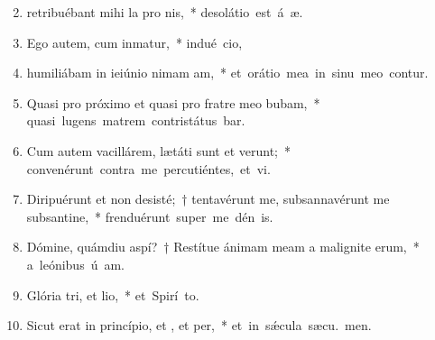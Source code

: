 \begin{flushleft}
\begin{enumerate}[leftmargin=*]
\setcounter{enumi}{1}

\item retribuébant mihi la pro nis,~* \mbox{desolátio est á æ.}

\item Ego autem, cum inmatur,~* \mbox{indué cio,}

\item humiliábam in ieiúnio nimam am,~* \mbox{et orátio mea in sinu meo contur.}

\item Quasi pro próximo et quasi pro fratre meo bubam,~* \mbox{quasi lugens matrem contristátus bar.}

\item Cum autem vacillárem, lætáti sunt et verunt;~* \mbox{convenérunt contra me percutiéntes, et vi.}

\item Diripuérunt et non desisté;~† tentavérunt me, subsannavérunt me subsantine,~* \mbox{frenduérunt super me dén is.}

\item Dómine, quámdiu aspí?~† Restítue ánimam meam a malignite erum,~* \mbox{a leónibus ú am.}


\item Glória tri, et lio,~* \mbox{et Spirí to.}

\item Sicut erat in princípio, et , et per,~* \mbox{et in s\'{\ae}cula sæcu. men.}

\end{enumerate}
\end{flushleft}

